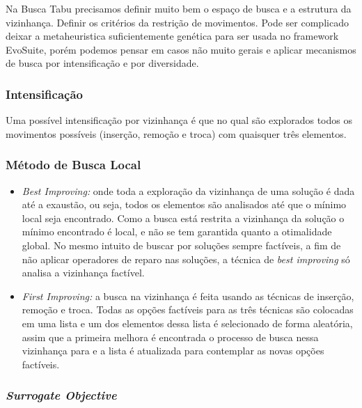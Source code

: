 \documentclass[12pt,a4paper]{article}
\begin{document}
    Na Busca Tabu precisamos definir muito bem o espaço de busca e a estrutura da vizinhança. Definir os critérios da restrição de movimentos. Pode ser complicado deixar a metaheuristica
    suficientemente genética para ser usada no framework EvoSuite, porém podemos pensar em casos não muito gerais e aplicar mecanismos de busca por intensificação e por diversidade.


    \subsubsection{Intensificação}

        Uma possível intensificação por vizinhança é que no qual são explorados todos os movimentos possíveis (inserção, remoção e troca) com quaisquer três elementos. 

    \subsubsection{Método de Busca Local}

        \begin{itemize}

        \item {\it Best Improving:} onde toda a exploração da vizinhança de uma solução é dada até a exaustão, ou seja, todos os elementos são analisados até que o mínimo local seja encontrado. Como
            a busca está restrita a vizinhança da solução o mínimo encontrado é local, e não se tem garantida quanto a otimalidade global. No mesmo intuito de buscar por soluções sempre factíveis, a
                fim de não aplicar operadores de reparo nas soluções, a técnica de {\it best improving} só analisa a vizinhança factível. 

        \item {\it First Improving:} a busca na vizinhança é feita usando as técnicas de inserção, remoção e troca. Todas as opções factíveis para as três técnicas são colocadas em uma lista
        e um dos elementos dessa lista é selecionado de forma aleatória, assim que a primeira melhora é encontrada o processo de busca nessa vizinhança para e a lista é atualizada para
        contemplar as novas opções factíveis. 
        \end{itemize}

    \subsubsection{\it Surrogate Objective} 
\end{document}
